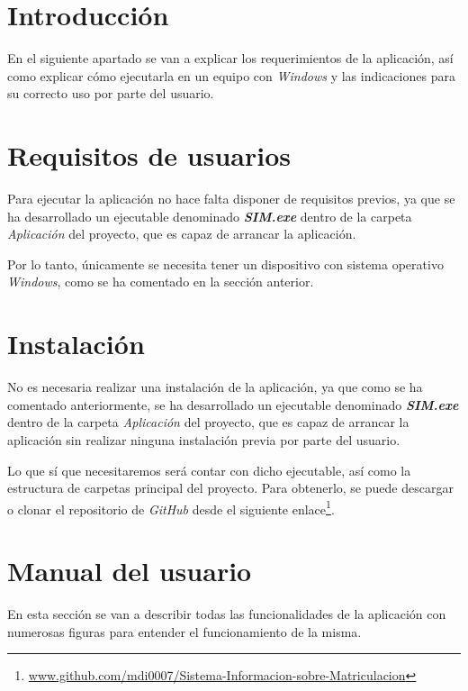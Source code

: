 
\section{Introducción}
En el siguiente apartado se van a explicar los requerimientos de la aplicación, así como explicar cómo ejecutarla en un equipo con \emph{Windows} y las indicaciones para su correcto uso por parte del usuario.

\section{Requisitos de usuarios}

Para ejecutar la aplicación no hace falta disponer de requisitos previos, ya que se ha desarrollado un ejecutable denominado \textbf{\emph{SIM.exe}} dentro de la carpeta \emph{Aplicación} del proyecto, que es capaz de arrancar la aplicación.

Por lo tanto, únicamente se necesita tener un dispositivo con sistema operativo \emph{Windows}, como se ha comentado en la sección anterior.



\section{Instalación}

No es necesaria realizar una instalación de la aplicación, ya que como se ha comentado anteriormente, se ha desarrollado un ejecutable denominado \textbf{\emph{SIM.exe}} dentro de la carpeta \emph{Aplicación} del proyecto, que es capaz de arrancar la aplicación sin realizar ninguna instalación previa por parte del usuario.

Lo que sí que necesitaremos será contar con dicho ejecutable, así como la estructura de carpetas principal del proyecto.
Para obtenerlo, se puede descargar o clonar el repositorio de \emph{GitHub} desde el siguiente enlace\footnote{\href {https://github.com/mdi0007/Sistema-Informacion-sobre-Matriculacion}{www.github.com/mdi0007/Sistema-Informacion-sobre-Matriculacion}}. 


\section{Manual del usuario}

En esta sección se van a describir todas las funcionalidades de la aplicación con numerosas figuras para entender el funcionamiento de la misma.

